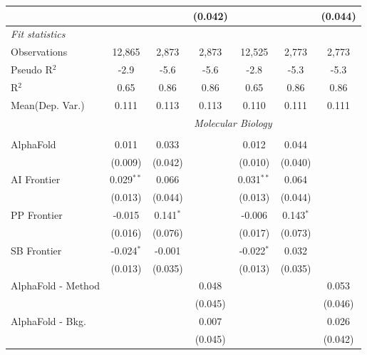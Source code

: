 \begin{tabular}{lcccccc}
                        &                &              & (0.042)       &                &              & (0.044)\\   
   \midrule
   \emph{Fit statistics}\\
   Observations         & 12,865         & 2,873        & 2,873         & 12,525         & 2,773        & 2,773\\  
   Pseudo R$^2$         & -2.9           & -5.6         & -5.6          & -2.8           & -5.3         & -5.3\\  
   R$^2$                & 0.65           & 0.86         & 0.86          & 0.65           & 0.86         & 0.86\\  
Mean(Dep. Var.) & 0.111 & 0.113 & 0.113 & 0.110 & 0.111 & 0.111 \\
   
 & \multicolumn{6}{c}{\textit{Molecular Biology}} \\ \\
   AlphaFold            & 0.011        & 0.033       &            & 0.012        & 0.044       &   \\   
                        & (0.009)      & (0.042)     &            & (0.010)      & (0.040)     &   \\   
   AI Frontier          & 0.029$^{**}$ & 0.066       &            & 0.031$^{**}$ & 0.064       &   \\   
                        & (0.013)      & (0.044)     &            & (0.013)      & (0.044)     &   \\   
   PP Frontier          & -0.015       & 0.141$^{*}$ &            & -0.006       & 0.143$^{*}$ &   \\   
                        & (0.016)      & (0.076)     &            & (0.017)      & (0.073)     &   \\   
   SB Frontier          & -0.024$^{*}$ & -0.001      &            & -0.022$^{*}$ & 0.032       &   \\   
                        & (0.013)      & (0.035)     &            & (0.013)      & (0.035)     &   \\   
   AlphaFold - Method   &              &             & 0.048      &              &             & 0.053\\   
                        &              &             & (0.045)    &              &             & (0.046)\\   
   AlphaFold - Bkg.     &              &             & 0.007      &              &             & 0.026\\   
                        &              &             & (0.045)    &              &             & (0.042)\\   

\end{tabular}
